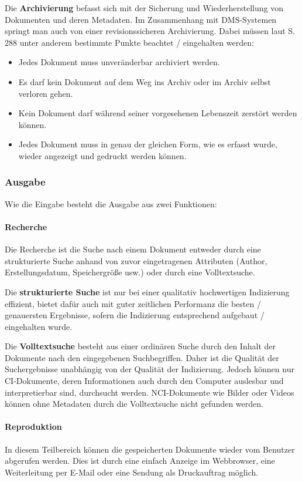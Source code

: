 Die \textbf{Archivierung} befasst sich mit der Sicherung und Wiederherstellung von Dokumenten und deren Metadaten.
Im Zusammenhang mit DMS-Systemen springt man auch von einer revisionssicheren Archivierung.
Dabei müssen laut \cite{DMS08} S. 288 unter anderem bestimmte Punkte beachtet / eingehalten werden:

\begin{itemize}
\item Jedes Dokument muss unveränderbar archiviert werden.
\item Es darf kein Dokument auf dem Weg ins Archiv oder im Archiv selbst verloren gehen.
\item Kein Dokument darf während seiner vorgesehenen Lebenszeit zerstört werden können.
\item Jedes Dokument muss in genau der gleichen Form, wie es erfasst wurde, wieder angezeigt und gedruckt werden können.
\end{itemize}

\subsubsection{Ausgabe}
Wie die Eingabe besteht die Ausgabe aus zwei Funktionen:

\paragraph{Recherche}
Die Recherche ist die Suche nach einem Dokument entweder durch eine strukturierte Suche anhand von zuvor eingetragenen Attributen (Author, Erstellungsdatum, Speichergröße usw.) oder durch eine Volltextsuche.

Die \textbf{strukturierte Suche} ist nur bei einer qualitativ hochwertigen Indizierung effizient, bietet dafür auch mit guter zeitlichen Performanz die besten / genauersten Ergebnisse, sofern die Indizierung entsprechend aufgebaut / eingehalten wurde.

Die \textbf{Volltextsuche} besteht aus einer ordinären Suche durch den Inhalt der Dokumente nach den eingegebenen Suchbegriffen.
Daher ist die Qualität der Suchergebnisse unabhängig von der Qualität der Indizierung.
Jedoch können nur \gls{CI}-Dokumente, deren Informationen auch durch den Computer auslesbar und interpretierbar sind, durchsucht werden.
\gls{NCI}-Dokumente wie Bilder oder Videos können ohne Metadaten durch die Volltextsuche nicht gefunden werden.

\paragraph{Reproduktion}
In diesem Teilbereich können die gespeicherten Dokumente wieder vom Benutzer abgerufen werden.
Dies ist durch eine einfach Anzeige im Webbrowser, eine Weiterleitung per E-Mail oder eine Sendung als Druckauftrag möglich.



